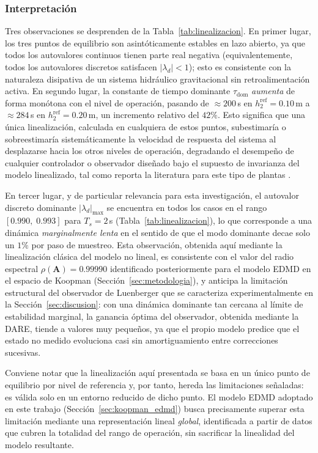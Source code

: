 \documentclass[12pt,letterpaper]{article}
\begin{document}
\subsubsection*{Interpretación}

Tres observaciones se desprenden de la Tabla~\ref{tab:linealizacion}. En primer
lugar, los tres puntos de equilibrio son asintóticamente estables en lazo abierto,
ya que todos los autovalores continuos tienen parte real negativa (equivalentemente,
todos los autovalores discretos satisfacen $|\lambda_d|<1$); esto es consistente con
la naturaleza disipativa de un sistema hidráulico gravitacional sin retroalimentación
activa. En segundo lugar, la constante de tiempo dominante $\tau_{\mathrm{dom}}$
\emph{aumenta} de forma monótona con el nivel de operación, pasando de
$\approx200$\,s en $h_2^{\mathrm{ref}}=0.10$\,m a $\approx284$\,s en
$h_2^{\mathrm{ref}}=0.20$\,m, un incremento relativo del $42\%$. Esto significa que
una única linealización, calculada en cualquiera de estos puntos, subestimaría o
sobreestimaría sistemáticamente la velocidad de respuesta del sistema al desplazarse
hacia los otros niveles de operación, degradando el desempeño de cualquier
controlador o observador diseñado bajo el supuesto de invarianza del modelo
linealizado, tal como reporta la literatura para este tipo de plantas
\cite{tuwien2025}.

En tercer lugar, y de particular relevancia para esta investigación, el autovalor
discreto dominante $|\lambda_d|_{\max}$ se encuentra en todos los casos en el rango
$[0.990,\;0.993]$ para $T_s=2$\,s (Tabla~\ref{tab:linealizacion}), lo que corresponde a una dinámica \emph{marginalmente lenta}
en el sentido de que el modo dominante decae solo un $1\%$ por paso de muestreo. Esta
observación, obtenida aquí mediante la linealización clásica del modelo no lineal, es
consistente con el valor del radio espectral $\rho(\mathbf{A})=0.99990$ identificado
posteriormente para el modelo EDMD en el espacio de Koopman
(Sección~\ref{sec:metodologia}), y anticipa la limitación estructural del observador
de Luenberger que se caracteriza experimentalmente en la
Sección~\ref{sec:discusion}: con una dinámica dominante tan cercana al límite de
estabilidad marginal, la ganancia óptima del observador, obtenida mediante la
DARE, tiende a valores muy pequeños, ya que el propio modelo predice que el estado
no medido evoluciona casi sin amortiguamiento entre correcciones sucesivas.

Conviene notar que la linealización aquí presentada se basa en un único punto de
equilibrio por nivel de referencia y, por tanto, hereda las limitaciones señaladas:
es válida solo en un entorno reducido de dicho punto. El modelo EDMD adoptado en este
trabajo (Sección~\ref{sec:koopman_edmd}) busca precisamente superar esta limitación
mediante una representación lineal \emph{global}, identificada a partir de datos que
cubren la totalidad del rango de operación, sin sacrificar la linealidad del modelo
resultante.
\end{document}

